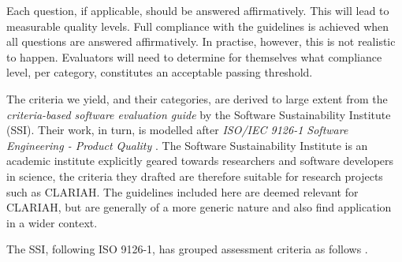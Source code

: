 \documentclass[a4paper,11pt]{article}
\begin{document}
Each question, if applicable, should be answered affirmatively. This will lead
to measurable quality levels. Full compliance with the guidelines is achieved
when all questions are answered affirmatively. In practise, however, this is
not realistic to happen. Evaluators will need to determine for themselves what
compliance level, per category, constitutes an acceptable passing threshold.

The criteria we yield, and their categories, are derived to large extent from
the \emph{criteria-based software evaluation guide} \cite{SSIGUIDE} by the
Software Sustainability Institute (SSI). Their work, in turn, is modelled after
\emph{ISO/IEC 9126-1 Software Engineering - Product Quality} \cite{ISO9126}.  The Software
Sustainability Institute\cite{SSIGENERAL} is an academic institute explicitly
geared towards researchers and software developers in science, the criteria
they drafted are therefore suitable for research projects such as CLARIAH. The
guidelines included here are deemed relevant for CLARIAH, but are generally of
a more generic nature and also find application in a wider context.

The SSI, following ISO 9126-1, has grouped assessment criteria as follows
\cite{SSIGUIDE}.
\end{document}
